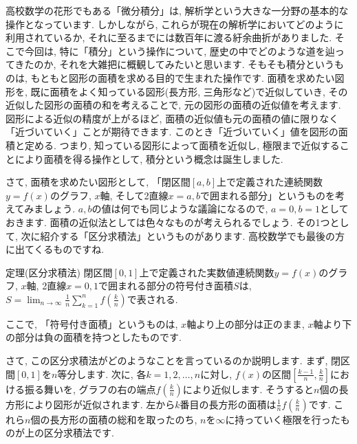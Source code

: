 



高校数学の花形でもある「微分積分」は, 解析学という大きな一分野の基本的な操作となっています. しかしながら, これらが現在の解析学においてどのように利用されているか, それに至るまでには数百年に渡る紆余曲折がありました. そこで今回は, 特に「積分」という操作について, 歴史の中でどのような道を辿ってきたのか, それを大雑把に概観してみたいと思います. 
そもそも積分というものは, もともと図形の面積を求める目的で生まれた操作です. 面積を求めたい図形を, 既に面積をよく知っている図形(長方形, 三角形など)で近似していき, その近似した図形の面積の和を考えることで, 元の図形の面積の近似値を考えます. 図形による近似の精度が上がるほど, 面積の近似値も元の面積の値に限りなく「近づいていく」ことが期待できます. このとき「近づいていく」値を図形の面積と定める. つまり, 知っている図形によって面積を近似し, 極限まで近似することにより面積を得る操作として, 積分という概念は誕生しました.
\par さて, 面積を求めたい図形として, 「閉区間$[a,b]$上で定義された連続関数$y=f(x)$のグラフ, $x$軸, そして2直線$x=a,b$で囲まれる部分」というものを考えてみましょう. $a,b$の値は何でも同じような議論になるので, $a=0,b=1$としておきます. 面積の近似法としては色々なものが考えられるでしょう. その1つとして, 次に紹介する「区分求積法」というものがあります. 高校数学でも最後の方に出てくるものですね. 
\begin{itembox}[l]{定理(区分求積法)}
閉区間$[0,1]$上で定義された実数値連続関数$y=f(x)$のグラフ, $x$軸, 2直線$x=0,1$で囲まれる部分の符号付き面積$S$は, $S=\displaystyle \lim_{n \to \infty}\frac{1}{n}\sum_{k=1}^n f\left(\frac{k}{n}\right)$で表される. 
\end{itembox}
\par ここで, 「符号付き面積」というものは, $x$軸より上の部分は正のまま, $x$軸より下の部分は負の面積を持つとしたものです. 
\par さて, この区分求積法がどのようなことを言っているのか説明します. まず, 閉区間$[0,1]$を$n$等分します. 次に, 各$k=1,2,\ldots ,n$に対し, $f(x)$の区間$\left[ \frac{k-1}{n},\frac{k}{n}\right]$における振る舞いを, グラフの右の端点$f\left(\frac{k}{n}\right)$により近似します. そうすると$n$個の長方形により図形が近似されます. 左から$k$番目の長方形の面積は$\frac{1}{n}f\left(\frac{k}{n}\right)$です. これら$n$個の長方形の面積の総和を取ったのち, $n$を$\infty$に持っていく極限を行ったものが上の区分求積法です. 
